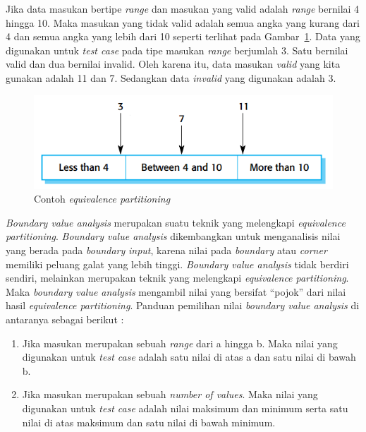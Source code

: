 Jika data masukan bertipe \emph{range} dan masukan yang valid adalah
\emph{range} bernilai 4 hingga 10. Maka masukan yang tidak valid
adalah semua angka yang kurang dari 4 dan semua angka yang lebih dari
10 seperti terlihat pada Gambar~\ref{fig:contoh-ep-marked}. Data
yang digunakan untuk \emph{test case} pada tipe masukan \emph{range}
berjumlah 3. Satu bernilai valid dan dua bernilai invalid. Oleh karena itu,
data masukan \emph{valid} yang kita gunakan adalah 11 dan 7. Sedangkan
data \emph{invalid} yang digunakan adalah 3.

\begin{figure}[H]
  \centering
  \includegraphics[width=.6\linewidth]{img/contoh-ep-marked}
  \caption{Contoh \emph{equivalence partitioning} \parencite{sommerville2016software}}\label{fig:contoh-ep-marked}
\end{figure}

\emph{Boundary value analysis} merupakan suatu teknik yang melengkapi
\emph{equivalence partitioning}. \emph{Boundary value analysis}
dikembangkan untuk menganalisis nilai yang berada pada \emph{boundary}
\emph{input}, karena nilai pada \emph{boundary} atau \emph{corner} memiliki
peluang galat yang lebih tinggi. \emph{Boundary value analysis} tidak
berdiri sendiri, melainkan merupakan teknik yang melengkapi
\emph{equivalence partitioning}. Maka \emph{boundary value analysis}
mengambil nilai yang bersifat ``pojok'' dari nilai hasil
\emph{equivalence partitioning}. Panduan pemilihan nilai
\emph{boundary value analysis} di antaranya sebagai berikut
\parencite{presman2010software}:

\begin{enumerate}[
leftmargin=0pt, itemindent=20pt,
labelwidth=15pt, labelsep=5pt, listparindent=0.7cm,
align=left]

\item Jika masukan merupakan sebuah \emph{range} dari a hingga
  b. Maka nilai yang digunakan untuk \emph{test case} adalah satu
  nilai di atas a dan satu nilai di bawah b.
\item Jika masukan merupakan sebuah \emph{number of values}. Maka
  nilai yang digunakan untuk \emph{test case} adalah nilai maksimum
  dan minimum serta satu nilai di atas maksimum dan satu nilai di
  bawah minimum.
\end{enumerate}

